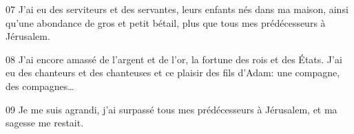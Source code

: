 
07 J’ai eu des serviteurs et des servantes, leurs enfants nés dans ma maison, ainsi qu’une abondance de gros et petit bétail, plus que tous mes prédécesseurs à Jérusalem.

08 J’ai encore amassé de l’argent et de l’or, la fortune des rois et des États. J’ai eu des chanteurs et des chanteuses et ce plaisir des fils d’Adam: une compagne, des compagnes…

09 Je me suis agrandi, j’ai surpassé tous mes prédécesseurs à Jérusalem, et ma sagesse me restait.
